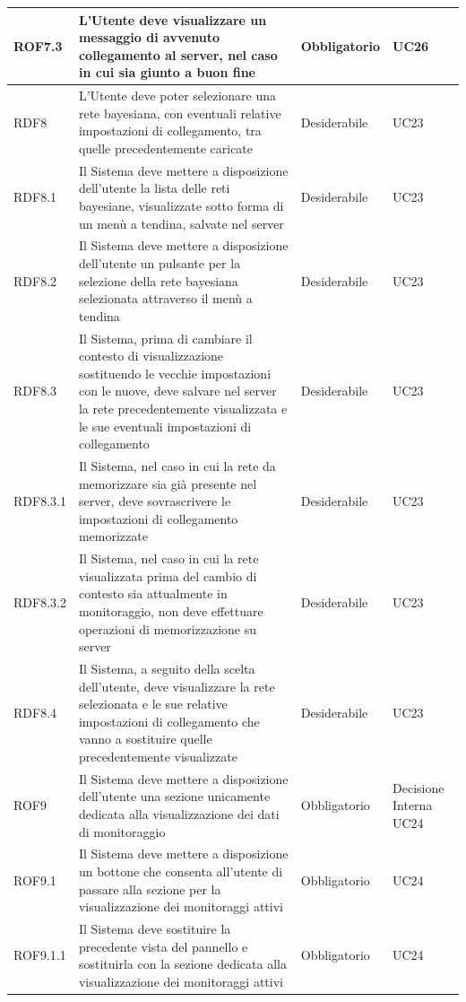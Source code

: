 \begin{center}
\begin{longtable}[c]{|m{}|m{}|m{}|m{}|}
\hline
ROF7.3 & L'Utente deve visualizzare un messaggio di avvenuto collegamento al server, nel caso in cui sia giunto a buon fine & Obbligatorio & UC26\\
\hline
\rowcolor{grigio}RDF8 & L'Utente deve poter selezionare una rete bayesiana, con eventuali relative impostazioni di collegamento, tra quelle precedentemente caricate & Desiderabile & UC23\\
\hline
RDF8.1 & Il Sistema deve mettere a disposizione dell'utente la lista delle reti bayesiane, visualizzate sotto forma di un menù a tendina, salvate nel server & Desiderabile & UC23\\
\hline
\rowcolor{grigio}RDF8.2 & Il Sistema deve mettere a disposizione dell'utente un pulsante per la selezione della rete bayesiana selezionata attraverso il menù a tendina & Desiderabile & UC23\\
\hline
RDF8.3 & Il Sistema, prima di cambiare il contesto di visualizzazione sostituendo le vecchie impostazioni con le nuove, deve salvare nel server la rete precedentemente visualizzata e le sue eventuali impostazioni di collegamento & Desiderabile & UC23\\
\hline
\rowcolor{grigio}RDF8.3.1 & Il Sistema, nel caso in cui la rete da memorizzare sia già presente nel server, deve sovrascrivere le impostazioni di collegamento memorizzate & Desiderabile & UC23\\
\hline
RDF8.3.2 & Il Sistema, nel caso in cui la rete visualizzata prima del cambio di contesto sia attualmente in monitoraggio, non deve effettuare operazioni di memorizzazione su server & Desiderabile & UC23\\
\hline
\rowcolor{grigio}RDF8.4 & Il Sistema, a seguito della scelta dell'utente, deve visualizzare la rete selezionata e le sue relative impostazioni di collegamento che vanno a sostituire quelle precedentemente visualizzate & Desiderabile & UC23\\
\hline
ROF9 & Il Sistema deve mettere a disposizione dell'utente una sezione unicamente dedicata alla visualizzazione dei dati di monitoraggio & Obbligatorio & Decisione Interna UC24\\
\hline
\rowcolor{grigio}ROF9.1 & Il Sistema deve mettere a disposizione un bottone che consenta all'utente di passare alla sezione per la visualizzazione dei monitoraggi attivi & Obbligatorio & UC24\\
\hline
ROF9.1.1 & Il Sistema deve sostituire la precedente vista del pannello e sostituirla con la sezione dedicata alla visualizzazione dei monitoraggi attivi & Obbligatorio & UC24\\

\end{longtable}
\end{center}
